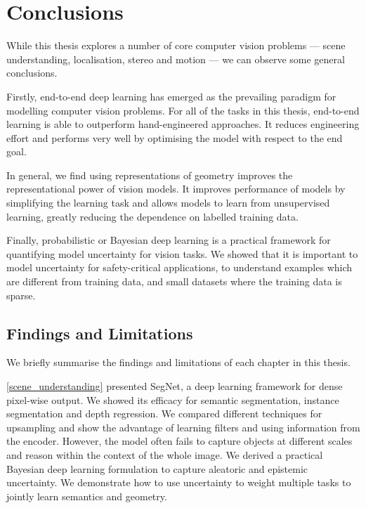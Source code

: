 \chapter{Conclusions}
\label{conclusions}


\graphicspath{{Chapter6/Figs/}}

While this thesis explores a number of core computer vision problems --- scene understanding, localisation, stereo and motion --- we can observe some general conclusions. 

Firstly, end-to-end deep learning has emerged as the prevailing paradigm for modelling computer vision problems. For all of the tasks in this thesis, end-to-end learning is able to outperform hand-engineered approaches. It reduces engineering effort and performs very well by optimising the model with respect to the end goal.

In general, we find using representations of geometry improves the representational power of vision models. It improves performance of models by simplifying the learning task and allows models to learn from unsupervised learning, greatly reducing the dependence on labelled training data.

Finally, probabilistic or Bayesian deep learning is a practical framework for quantifying model uncertainty for vision tasks. We showed that it is important to model uncertainty for safety-critical applications, to understand examples which are different from training data, and small datasets where the training data is sparse.

\section{Findings and Limitations}

We briefly summarise the findings and limitations of each chapter in this thesis.

\cref{scene_understanding} presented SegNet, a deep learning framework for dense pixel-wise output. We showed its efficacy for semantic segmentation, instance segmentation and depth regression. We compared different techniques for upsampling and show the advantage of learning filters and using information from the encoder. However, the model often fails to capture objects at different scales and reason within the context of the whole image. We derived a practical Bayesian deep learning formulation to capture aleatoric and epistemic uncertainty. We demonstrate how to use uncertainty to weight multiple tasks to jointly learn semantics and geometry.

